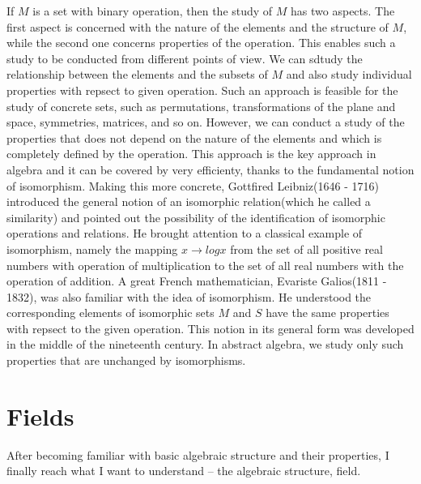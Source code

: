 \documentclass[a4paper]{article}
\begin{document}
	If $M$ is a set with binary operation, then the study of $M$ has two
	aspects. The first aspect is concerned with the nature of the elements
	and the structure of $M$, while the second one concerns properties of
	the operation. This enables such a study to be conducted from different
	points of view. We can sdtudy the relationship between the elements and
	the subsets of $M$ and also study individual properties with repsect to
	given operation. Such an approach is feasible for the study of concrete
	sets, such as permutations, transformations of the plane and space,
	symmetries, matrices, and so on. However, we can conduct a study of the
	properties that does not depend on the nature of the elements and which
	is completely defined by the operation. This approach is the key
	approach in algebra and it can be covered by very efficienty, thanks to
	the fundamental notion of isomorphism. Making this more concrete,
	Gottfired Leibniz(1646 - 1716) introduced the general notion of an
	isomorphic relation(which he called a similarity) and pointed out the
	possibility of the identification of isomorphic operations and
	relations. He brought attention to a classical example of isomorphism,
	namely the mapping $x \rightarrow logx$ from the set of all positive
	real numbers with operation of multiplication to the set of all real
	numbers with the operation of addition. A great French mathematician,
	Evariste Galios(1811 - 1832), was also familiar with the idea of
	isomorphism. He understood the corresponding elements of isomorphic sets
	$M$ and $S$ have the same properties with repsect to the given
	operation. This notion in its general form was developed in the middle
	of the nineteenth century. In abstract algebra, we study only such
	properties that are unchanged by isomorphisms.\cite{dixon2011algebra}

\section{Fields}

After becoming familiar with basic algebraic structure and their
properties, I finally reach what I want to understand -- the algebraic
structure, field.
\end{document}
